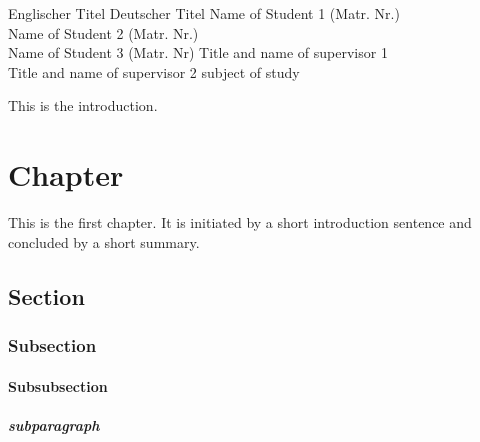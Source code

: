 \documentclass[xlevel, hyperref, nat, mp, en]{wise}
\begin{document}
\seminartitlepage
{Englischer Titel}
{Deutscher Titel}
{Name of Student 1 (Matr. Nr.) \\ Name of Student 2 (Matr. Nr.) \\ Name of Student 3 (Matr. Nr)}
{Title and name of supervisor 1 \\ Title and name of supervisor 2}
{subject of study}

\begin{preface}
  \abstract
  

  \tableofcontents
\end{preface}

\introduction

This is the introduction.


\section{Chapter}

This is the first chapter. It is initiated by a short introduction sentence and concluded by a short summary. 




\label{sec:chapter}



\subsection{Section}
\label{sec:section}

\cite{article}

\subsubsection{Subsection}
\label{sec:subsection}


\paragraph{Subsubsection}
\label{sec:subsubsection}

\subparagraph{subparagraph}
\label{sec:subparagraph}
\end{document}
